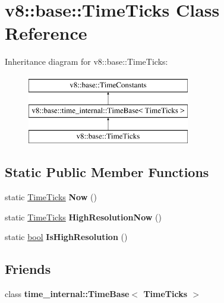 \hypertarget{classv8_1_1base_1_1TimeTicks}{}\section{v8\+:\+:base\+:\+:Time\+Ticks Class Reference}
\label{classv8_1_1base_1_1TimeTicks}
Inheritance diagram for v8\+:\+:base\+:\+:Time\+Ticks\+:\begin{figure}[H]
\begin{center}
\leavevmode
\includegraphics[height=3.000000cm]{classv8_1_1base_1_1TimeTicks}
\end{center}
\end{figure}
\subsection*{Static Public Member Functions}
\begin{DoxyCompactItemize}
\item 
\mbox{\label{classv8_1_1base_1_1TimeTicks_ab0886bf0e84f1e1fcdc101021c2c0775}} 
static \mbox{\hyperlink{classv8_1_1base_1_1TimeTicks}{Time\+Ticks}} {\bfseries Now} ()
\item 
\mbox{\label{classv8_1_1base_1_1TimeTicks_ac7deb01c860efc1e2feb7b8fecd4d870}} 
static \mbox{\hyperlink{classv8_1_1base_1_1TimeTicks}{Time\+Ticks}} {\bfseries High\+Resolution\+Now} ()
\item 
\mbox{\label{classv8_1_1base_1_1TimeTicks_acdd9f8482c321164c58f46bc65372c9b}} 
static \mbox{\hyperlink{classbool}{bool}} {\bfseries Is\+High\+Resolution} ()
\end{DoxyCompactItemize}
\subsection*{Friends}
\begin{DoxyCompactItemize}
\item 
\mbox{\label{classv8_1_1base_1_1TimeTicks_a0d0b1ceeed176bc41d8cfb397a70ce07}} 
class {\bfseries time\+\_\+internal\+::\+Time\+Base$<$ Time\+Ticks $>$}
\end{DoxyCompactItemize}
